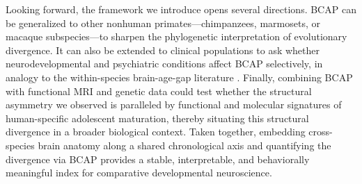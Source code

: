 \documentclass[11pt]{article}
\begin{document}
Looking forward, the framework we introduce opens several directions. BCAP can be generalized to other nonhuman primates---chimpanzees, marmosets, or macaque subspecies---to sharpen the phylogenetic interpretation of evolutionary divergence. It can also be extended to clinical populations to ask whether neurodevelopmental and psychiatric conditions affect BCAP selectively, in analogy to the within-species brain-age-gap literature \citep{cole2017predicting, hajek2019brain, mcwhinney2021obesity}. Finally, combining BCAP with functional MRI and genetic data could test whether the structural asymmetry we observed is paralleled by functional and molecular signatures of human-specific adolescent maturation, thereby situating this structural divergence in a broader biological context. Taken together, embedding cross-species brain anatomy along a shared chronological axis and quantifying the divergence via BCAP provides a stable, interpretable, and behaviorally meaningful index for comparative developmental neuroscience.


\end{document}
